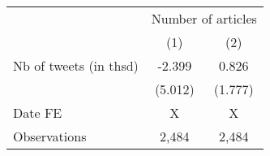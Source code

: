 {
\def\sym#1{\ifmmode^{#1}\else\(^{#1}\)\fi}
\begin{tabular}{l*{2}{c}}
\hline\hline
                    &\multicolumn{2}{c}{Number of articles}     \\\cmidrule(lr){2-3}
                    &\multicolumn{1}{c}{(1)}         &\multicolumn{1}{c}{(2)}         \\
\hline
Nb of tweets (in thsd)&      -2.399         &       0.826         \\
                    &     (5.012)         &     (1.777)         \\
\hline
Date FE             &           X         &           X         \\
Observations        &       2,484         &       2,484         \\
\hline\hline
\end{tabular}
}
